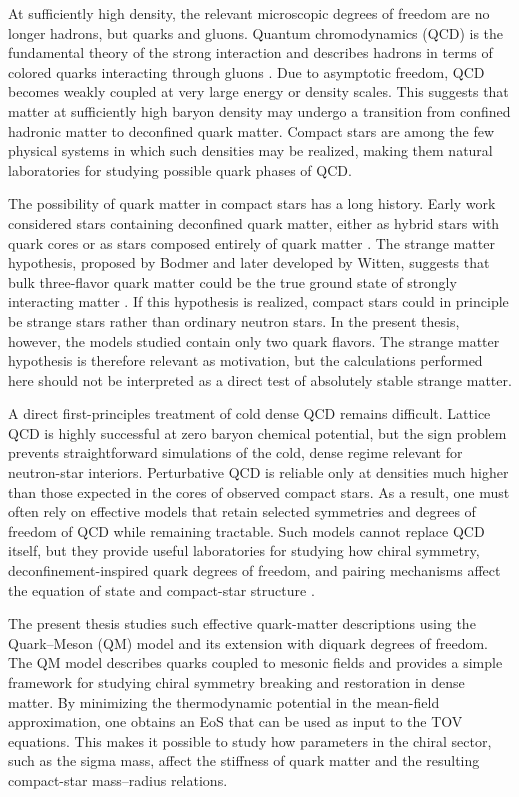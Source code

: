 At sufficiently high density, the relevant microscopic degrees of freedom are no
longer hadrons, but quarks and gluons. Quantum chromodynamics (QCD) is the
fundamental theory of the strong interaction and describes hadrons in terms of
colored quarks interacting through gluons \cite{GrossWilczek1973,
PeskinSchroeder1995}. Due to asymptotic freedom, QCD becomes weakly coupled at
very large energy or density scales. This suggests that matter at sufficiently
high baryon density may undergo a transition from confined hadronic matter to
deconfined quark matter. Compact stars are among the few physical systems in
which such densities may be realized, making them natural laboratories for
studying possible quark phases of QCD.

The possibility of quark matter in compact stars has a long history. Early work
considered stars containing deconfined quark matter, either as hybrid stars with
quark cores or as stars composed entirely of quark matter
\cite{Itoh1970,Bodmer1971,Witten1984,glendenning2000}. The strange matter
hypothesis, proposed by Bodmer and later developed by Witten, suggests that bulk
three-flavor quark matter could be the true ground state of strongly interacting
matter \cite{Bodmer1971,Witten1984}. If this hypothesis is realized, compact
stars could in principle be strange stars rather than ordinary neutron stars.
In the present thesis, however, the models studied contain only two quark
flavors. The strange matter hypothesis is therefore relevant as motivation, but
the calculations performed here should not be interpreted as a direct test of
absolutely stable strange matter.

A direct first-principles treatment of cold dense QCD remains difficult. Lattice
QCD is highly successful at zero baryon chemical potential, but the sign problem
prevents straightforward simulations of the cold, dense regime relevant for
neutron-star interiors. Perturbative QCD is reliable only at densities much
higher than those expected in the cores of observed compact stars. As a result,
one must often rely on effective models that retain selected symmetries and
degrees of freedom of QCD while remaining tractable. Such models cannot replace
QCD itself, but they provide useful laboratories for studying how chiral symmetry,
deconfinement-inspired quark degrees of freedom, and pairing mechanisms affect
the equation of state and compact-star structure
\cite{Baym2018,Alford2008,Kurkela2010,Komoltsev2022}.

The present thesis studies such effective quark-matter descriptions using the Quark--Meson (QM)
model and its extension with diquark degrees of freedom. The QM model describes
quarks coupled to mesonic fields and provides a simple framework for studying
chiral symmetry breaking and restoration in dense matter. By minimizing the
thermodynamic potential in the mean-field approximation, one obtains an EoS that
can be used as input to the TOV equations. This makes it possible to study how
parameters in the chiral sector, such as the sigma mass, affect the stiffness of
quark matter and the resulting compact-star mass--radius relations.


